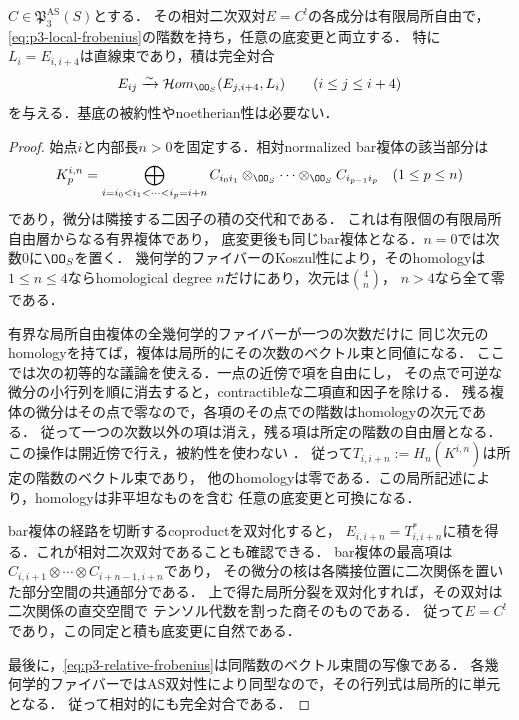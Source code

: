 \begin{lemma}[相対Koszul双対は全底変更と両立する]
\label{lem:p3-relative-bar}
$C\in\mathfrak P_3^{\mathrm{AS}}(S)$とする．
その相対二次双対$E=C^!$の各成分は有限局所自由で，
\eqref{eq:p3-local-frobenius}の階数を持ち，任意の底変更と両立する．
特に$L_i=E_{i,i+4}$は直線束であり，積は完全対合
\begin{equation}\label{eq:p3-relative-frobenius}
 E_{ij}\xrightarrow{\sim}
 \mathcal Hom_{\OO_S}(E_{j,i+4},L_i)
 \qquad(i\le j\le i+4)
\end{equation}
を与える．基底の被約性やnoetherian性は必要ない．
\end{lemma}
\begin{proof}
始点$i$と内部長$n>0$を固定する．相対normalized bar複体の該当部分は
\begin{equation}\label{eq:p3-bar-complex}
 K^{i,n}_p=
 \bigoplus_{i=i_0<i_1<\cdots<i_p=i+n}
 C_{i_0i_1}\otimes_{\OO_S}\cdots\otimes_{\OO_S}C_{i_{p-1}i_p}
 \quad(1\le p\le n)
\end{equation}
であり，微分は隣接する二因子の積の交代和である．
これは有限個の有限局所自由層からなる有界複体であり，
底変更後も同じbar複体となる．$n=0$では次数0に$\OO_S$を置く．
幾何学的ファイバーのKoszul性により，そのhomologyは
$1\le n\le4$ならhomological degree $n$だけにあり，次元は$\binom4n$，
$n>4$なら全て零である．

有界な局所自由複体の全幾何学的ファイバーが一つの次数だけに
同じ次元のhomologyを持てば，複体は局所的にその次数のベクトル束と同値になる．
ここでは次の初等的な議論を使える．一点の近傍で項を自由にし，
その点で可逆な微分の小行列を順に消去すると，contractibleな二項直和因子を除ける．
残る複体の微分はその点で零なので，各項のその点での階数はhomologyの次元である．
従って一つの次数以外の項は消え，残る項は所定の階数の自由層となる．
この操作は開近傍で行え，被約性を使わない
\cite[Tags~0BDK, 0BCD]{StacksPerfect}．
従って$T_{i,i+n}:=H_n(K^{i,n})$は所定の階数のベクトル束であり，
他のhomologyは零である．この局所記述により，homologyは非平坦なものを含む
任意の底変更と可換になる．

bar複体の経路を切断するcoproductを双対化すると，
$E_{i,i+n}=T_{i,i+n}^*$に積を得る．これが相対二次双対であることも確認できる．
bar複体の最高項は$C_{i,i+1}\otimes\cdots\otimes C_{i+n-1,i+n}$であり，
その微分の核は各隣接位置に二次関係を置いた部分空間の共通部分である．
上で得た局所分裂を双対化すれば，その双対は二次関係の直交空間で
テンソル代数を割った商そのものである．
従って$E=C^!$であり，この同定と積も底変更に自然である．

最後に，\eqref{eq:p3-relative-frobenius}は同階数のベクトル束間の写像である．
各幾何学的ファイバーではAS双対性により同型なので，その行列式は局所的に単元となる．
従って相対的にも完全対合である．
\end{proof}

